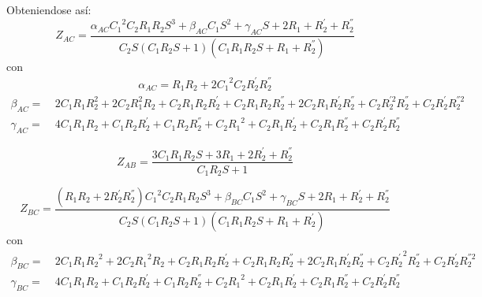 \documentclass[a4paper]{article}
\begin{document}
Obteniendose así:
\begin{equation*}
	Z_{AC} =  \frac{\alpha_{AC} {C_{1}}^{2} C_2 R_{1} R_{2} S^{3} + \beta_{AC} C_1 S^{2}
		+ \gamma_{AC} S + 2 R_1 + R_{2}^{'} + R_{2}^{''}}{
		 C_2 S \left( C_1 R_{2} S + 1 \right)
		\left(C_1 R_1 R_{2} S + R_1 + R_{2}^{''}\right)}
\end{equation*}
con
\begin{equation*}
\begin{split}
	\alpha_{AC} = R_{1} R_{2} + 2 {C_{1}}^{2} C_2 R_{2}^{'} R_{2}^{''}
\end{split}
\end{equation*}
\begin{equation*}
\begin{split}
	\beta_{AC} =\ & 2 C_{1} R_1 R_{2}^{2} + 2 C_2 R_{1}^{2} R_{2} + C_2 R_1 R_{2} R_{2}^{'} +
		C_2 R_1 R_{2} R_{2}^{''} + 2 C_2 R_1 R_{2}^{'} R_{2}^{''} + C_2 R_{2}^{'2} R_{2}^{''} + C_2 R_{2}^{'} R_{2}^{''2}\\
	\gamma_{AC} =\ & 4 C_1 R_1 R_{2} + C_1 R_{2} R_{2}^{'} + C_1 R_{2} R_{2}^{''} +
		C_2 {R_{1}}^{2} + C_2 R_1 R_{2}^{'} + C_2 R_1 R_{2}^{''} + C_2 R_{2}^{'} R_{2}^{''}
\end{split}
\end{equation*}

\begin{equation*}
	Z_{AB} = \frac{3 C_1 R_1 R_{2} S + 3 R_1 + 2 R_{2}^{'} + R_{2}^{''}}{C_1 R_{2} S + 1}
\end{equation*}

\begin{equation*}
	Z_{BC} =
	\frac{ \left( R_1 R_{2} + 2 R_{2}^{'} R_{2}^{''} \right ){C_{1}}^{2} C_2 R_1 R_{2} S^{3} +
	\beta_{BC} C_1 S^{2} + \gamma_{BC} S + 2 R_1 + R_{2}^{'} + R_{2}^{''}}
	{C_2 S \left(C_1 R_{2} S + 1\right) \left(C_1 R_1 R_{2} S + R_1 + R_{2}^{'} \right)}
\end{equation*}
con
\begin{equation*}
\begin{split}
	\beta_{BC} =\ & 2 C_1 R_1 {R_{2}}^{2} + 2C_2 {R_{1}}^{2} R_{2} + C_2 R_1 R_{2} R_{2}^{'} + C_2 R_1 R_{2} R_{2}^{''} + 2 C_2 R_1 R_{2}^{'} R_{2}^{''} + 
	C_2 {R_{2}^{'}}^2 R_{2}^{''} + C_2 R_{2}^{'} R_{2}^{''2}\\
	\gamma_{BC} =\ & 4 C_1 R_1 R_{2} + C_1 R_{2} R_{2}^{'} + C_1 R_{2} R_{2}^{''} +
	C_2 {R_{1}}^{2} + C_2 R_1 R_{2}^{'} + C_2 R_1 R_{2}^{''} +
	C_2 R_{2}^{'} R_{2}^{''} 
\end{split}
\end{equation*}
\end{document}
